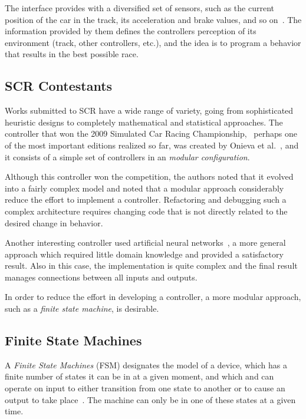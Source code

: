 The interface provides with a diversified set of sensors, such as the current 
position of the car in the track, its acceleration and brake values, and so on~\cite{scr2009}. 
The information provided by them defines the controllers perception of its environment (track, other controllers, etc.), and the idea is to program a behavior that results
in the best possible race. 

\subsection{SCR Contestants}
Works submitted to SCR have a wide range of variety, going from sophisticated 
heuristic designs to completely mathematical and statistical approaches. The 
controller that won the 2009 Simulated Car Racing Championship,~\cite{scr2009}
perhaps one of the most important editions realized so far, was created by 
Onieva et al.~\cite{onieva_2009}, and it 
consists of a simple set of controllers in an \emph{modular configuration}. 

Although this controller won the competition, the authors noted that it evolved 
into a fairly complex model and noted that a modular approach considerably reduce 
the effort to implement a  controller. Refactoring and debugging such a complex 
architecture requires changing code that is not directly related to the desired
change in behavior.

Another interesting controller used  artificial neural networks~\cite{cardamone_2010},
a more general approach which required little domain knowledge and provided a 
satisfactory result. Also in this case,  the implementation is quite complex and 
the final result manages connections between all inputs and outputs.

In order to reduce the effort in developing a controller, a more modular approach,
such as a \emph{finite state machine}, is desirable.

\subsection{Finite State Machines}\label{sec:fsm}

A \emph{Finite State Machines} (FSM) designates the model of a device, which has 
a finite number of states it can be in at a given moment, and which and can 
operate on input to either transition from one state to another or to cause an 
output to take place~\cite{buckland2005}. The machine can only be in one of these 
states at a given time.

